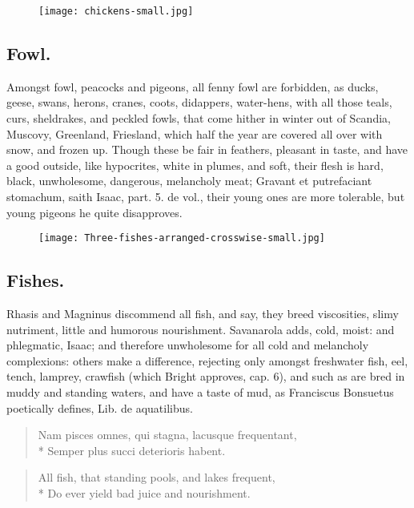 {{\begin{figure}[H]
  \begingroup
  \centering
  \texttt{[image: chickens-small.jpg]}
  \label{fig:chickens}
\end{figure}

\subsection{Fowl.}
Amongst fowl, peacocks and pigeons, all fenny fowl are
forbidden, as ducks, geese, swans, herons, cranes, coots, didappers,
water-hens, with all those teals, curs, sheldrakes, and peckled fowls,
that come hither in winter out of Scandia, Muscovy, Greenland,
Friesland, which half the year are covered all over with snow, and
frozen up. Though these be fair in feathers, pleasant in taste, and
have a good outside, like hypocrites, white in plumes, and soft, their
flesh is hard, black, unwholesome, dangerous, melancholy meat; Gravant
et putrefaciant stomachum, saith Isaac, part. 5. de vol., their young
ones are more tolerable, but young pigeons he quite disapproves.

\begin{figure}[H]
  \begingroup
  \centering
  \texttt{[image: Three-fishes-arranged-crosswise-small.jpg]}
  \label{fig:threefishes}
\end{figure}

\subsection{Fishes.}\label{sec:fishes}
Rhasis and Magninus discommend all fish, and say, they
breed viscosities, slimy nutriment, little and humorous nourishment.
Savanarola adds, cold, moist: and phlegmatic, Isaac; and therefore
unwholesome for all cold and melancholy complexions: others make a
difference, rejecting only amongst freshwater fish, eel, tench,
lamprey, crawfish (which Bright approves, cap. 6), and such as are bred
in muddy and standing waters, and have a taste of mud, as Franciscus
Bonsuetus poetically defines, Lib. de aquatilibus.
%
\begin{latin}
\begin{verse}
Nam pisces omnes, qui stagna, lacusque frequentant,\\*
Semper plus succi deterioris habent.
\end{verse}
\end{latin}
\translationrule
\begin{verse}
All fish, that standing pools, and lakes frequent,\\*
Do ever yield bad juice and nourishment.
\end{verse}

}}
